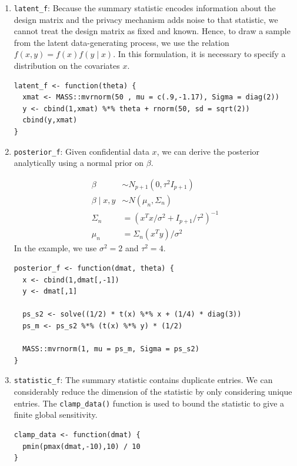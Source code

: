 \begin{enumerate}
\def\labelenumi{\arabic{enumi}.}
\item
  \texttt{latent\_f}: Because the summary statistic encodes information about the design
  matrix and the privacy mechanism adds noise to that statistic, we cannot treat the
  design matrix as fixed and known. Hence, to draw a sample from the latent data-generating
  process, we use the relation \(f(x,y) = f(x)f(y \mid x)\). In this formulation,
  it is necessary to specify a distribution on the covariates \(x\).

\begin{verbatim}
latent_f <- function(theta) {
  xmat <- MASS::mvrnorm(50 , mu = c(.9,-1.17), Sigma = diag(2))
  y <- cbind(1,xmat) %*% theta + rnorm(50, sd = sqrt(2))
  cbind(y,xmat)
}
\end{verbatim}
\item
  \texttt{posterior\_f}: Given confidential data \(x\), we can derive the posterior analytically
  using a normal prior on \(\beta\).

  \begin{equation*}
   \begin{aligned}
   \beta &\sim N_{p+1}(0, \tau^2 I_{p+1})\\
   \beta \mid x,y &\sim N(\mu_n, \Sigma_n)\\
   \Sigma_n &= (x^Tx/\sigma^2 + I_{p+1}/\tau^2)^{-1}\\
   \mu_n &= \Sigma_n(x^Ty)/\sigma^2
   \end{aligned}
   \end{equation*}
  In the example, we use \(\sigma^2 = 2\) and \(\tau^2 = 4\).

\begin{verbatim}
posterior_f <- function(dmat, theta) {
  x <- cbind(1,dmat[,-1])
  y <- dmat[,1]

  ps_s2 <- solve((1/2) * t(x) %*% x + (1/4) * diag(3))
  ps_m <- ps_s2 %*% (t(x) %*% y) * (1/2)

  MASS::mvrnorm(1, mu = ps_m, Sigma = ps_s2)
}
\end{verbatim}
\item
  \texttt{statistic\_f}: The summary statistic contains duplicate
  entries. We can considerably reduce the dimension of the
  statistic by only considering unique entries. The \texttt{clamp\_data()}
  function is used to bound the statistic to give a finite
  global sensitivity.

\begin{verbatim}
clamp_data <- function(dmat) {
  pmin(pmax(dmat,-10),10) / 10
}


\end{verbatim}
\end{enumerate}
